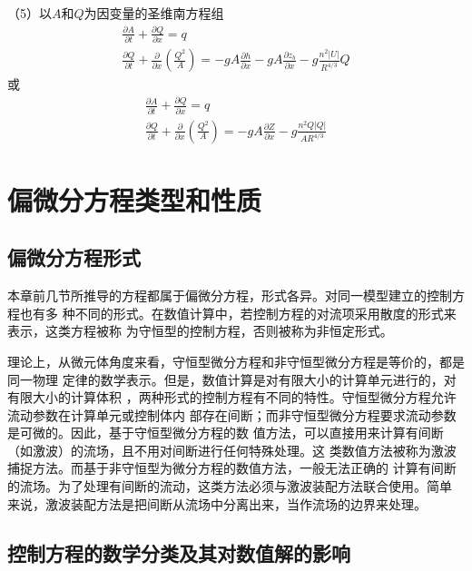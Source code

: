 （5）以$A$和$Q$为因变量的圣维南方程组
\begin{equation}
  \begin{gathered}
    \frac{\partial A}{\partial t}
    +
    \frac{\partial Q}{\partial x}
    =
    q
  \\
  \frac{\partial Q}{\partial t}
  +
  \frac{\partial}{\partial x}\left(\frac{Q^{2}}{A}\right)
  =
  -gA\frac{\partial h}{\partial x}
  -gA\frac{\partial z_{b}}{\partial x}
  -g\frac{n^{2}|U|}{R^{4/3}}Q
  \end{gathered}
  \label{EqCGe_SV_AQ_1}
\end{equation}
或
\begin{equation}
  \begin{gathered}
    \frac{\partial A}{\partial t}
    +
    \frac{\partial Q}{\partial x}
    =
    q
  \\
  \frac{\partial Q}{\partial t}
  +
  \frac{\partial}{\partial x}\left(\frac{Q^{2}}{A}\right)
  =
  -
  gA\frac{\partial Z}{\partial x}
  -
  g\frac{n^{2}Q|Q|}{AR^{4/3}}
  \end{gathered}
  \label{EqCGe_SV_AQ_2}
\end{equation}

\section{偏微分方程类型和性质}
\subsection{偏微分方程形式}
本章前几节所推导的方程都属于偏微分方程，形式各异。对同一模型建立的控制方程也有多
种不同的形式。在数值计算中，若控制方程的对流项采用散度的形式来表示，这类方程被称
为守恒型的控制方程，否则被称为非恒定形式。

理论上，从微元体角度来看，守恒型微分方程和非守恒型微分方程是等价的，都是同一物理
定律的数学表示。但是，数值计算是对有限大小的计算单元进行的，对有限大小的计算体积
，两种形式的控制方程有不同的特性。守恒型微分方程允许流动参数在计算单元或控制体内
部存在间断；而非守恒型微分方程要求流动参数是可微的。因此，基于守恒型微分方程的数
值方法，可以直接用来计算有间断（如激波）的流场，且不用对间断进行任何特殊处理。这
类数值方法被称为激波捕捉方法。而基于非守恒型为微分方程的数值方法，一般无法正确的
计算有间断的流场。为了处理有间断的流动，这类方法必须与激波装配方法联合使用。简单
来说，激波装配方法是把间断从流场中分离出来，当作流场的边界来处理。

\subsection{控制方程的数学分类及其对数值解的影响}

